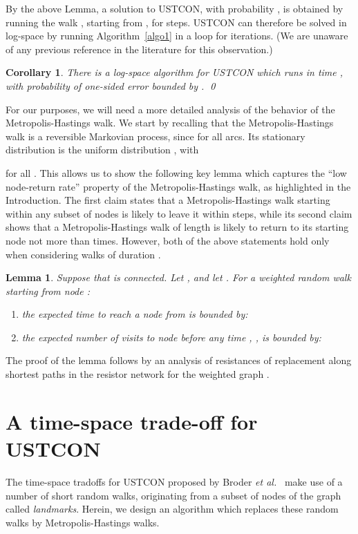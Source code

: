 \documentclass[11pt,a4paper]{article}
\newtheorem{corollary}{Corollary}
\newtheorem{lemma}{Lemma}
\newcommand{\Broder}{Broder \etal}
\newcommand{\etal}{\textsl{et al.}\xspace}
\renewcommand{\*}{\hspace*{5mm}}
\begin{document}
By the above Lemma, a solution to USTCON, with probability , is obtained by running the walk , starting from , for  steps. USTCON can therefore be solved in log-space by running Algorithm~\ref{algo1} in a loop for  iterations. (We are unaware of any previous reference in the literature for this observation.)

\begin{corollary}
There is a log-space algorithm for USTCON which runs in time , with probability of one-sided error bounded by .
\qed
\end{corollary}

For our purposes, we will need a more detailed analysis of the behavior of the Metropolis-Hastings walk. We start by recalling that the Metropolis-Hastings walk  is a reversible Markovian process, since  for all arcs. Its stationary distribution is the uniform distribution , with

for all . This allows us to show the following key lemma which captures the ``low node-return rate'' property of the Metropolis-Hastings walk, as highlighted in the Introduction. The first claim states that a Metropolis-Hastings walk starting within any subset of nodes  is likely to leave it within  steps, while its second claim shows that a Metropolis-Hastings walk of length  is likely to return to its starting node not more than  times. However, both of the above statements hold only when considering walks of duration .
\begin{lemma}\label{lemiii}
Suppose that  is connected. Let , and let . For a weighted random walk  starting from node :
\begin{enumerate}
\item[(i)] the expected time to reach a node from  is bounded by:

\item[(ii)] the expected number of visits to node  before any time , , is bounded by:

\end{enumerate}
\end{lemma}
The proof of the lemma follows by an analysis of resistances of replacement along shortest paths in the resistor network for the weighted graph .

\section{A time-space trade-off for USTCON}\label{sec3}

The time-space tradoffs for USTCON proposed by \Broder~\cite{BKRU} make use of a number of short random walks, originating from a subset of nodes of the graph called \emph{landmarks}. Herein, we design an algorithm which replaces these random walks by Metropolis-Hastings walks.
\end{document}
